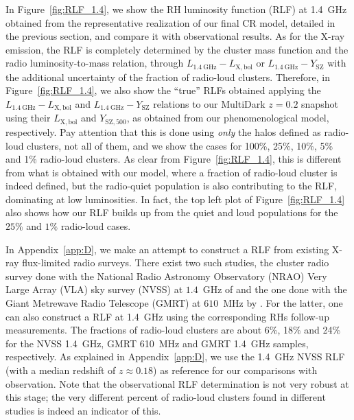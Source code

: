 \documentclass[traditabstract]{aa}
\newcommand{\rmn}{\mathrm}
\begin{document}
In Figure~\ref{fig:RLF_1.4}, we show the RH luminosity function (RLF) at 1.4~GHz obtained from the representative realization of our final CR model, detailed in the previous section, and compare it with observational results. As for the X-ray emission, the RLF is completely determined by the cluster mass function and the radio luminosity-to-mass relation, through $L_{1.4~\rmn{GHz}}-L_{ \rmn{X,bol}}$ or $L_{1.4~\rmn{GHz}}-Y_{\rmn{SZ}}$ with the additional uncertainty of the fraction of radio-loud clusters. Therefore, in Figure~\ref{fig:RLF_1.4}, we also show the ``true'' RLFs obtained applying  the $L_{1.4~\rmn{GHz}}-L_{\rmn{X,bol}}$ and $L_{1.4~\rmn{GHz}}-Y_{\rmn{SZ}}$ relations to our MultiDark $z = 0.2$ snapshot using their $L_{\rmn{X,bol}}$ and $Y_{\rmn{SZ}, 500}$, as obtained from our phenomenological model, respectively. Pay attention that this is done using \emph{only} the halos defined as radio-loud clusters, not all of them, and we show the cases for 100\%, 25\%, 10\%, 5\% and 1\% radio-loud clusters. As clear from Figure~\ref{fig:RLF_1.4}, this is different from what is obtained with our model, where a fraction of radio-loud cluster is indeed defined, but the radio-quiet population is also contributing to the RLF, dominating at low luminosities. In fact, the top left plot of Figure~\ref{fig:RLF_1.4} also shows how our RLF builds up from the quiet and loud populations for the $25\%$ and $1\%$ radio-loud cases.

In Appendix~\ref{app:D}, we make an attempt to construct a RLF from existing X-ray flux-limited radio surveys. There exist two such studies, the cluster radio survey done with the National Radio Astronomy Observatory (NRAO) Very Large Array (VLA) sky survey (NVSS) at $1.4$~GHz of \cite{1999NewA....4..141G} and the one done with the Giant Metrewave Radio Telescope (GMRT) at $610$~MHz by \cite{VenturiGMRT_1,VenturiGMRT_2}. For the latter, one can also construct a RLF at 1.4~GHz using the corresponding RHs follow-up measurements. The fractions of radio-loud clusters are about 6\%, 18\% and 24\% for the NVSS 1.4~GHz, GMRT 610~MHz and GMRT 1.4~GHz samples, respectively. As explained in Appendix~\ref{app:D}, we use the 1.4~GHz NVSS RLF (with a median redshift of $z \approx 0.18$) as reference for our comparisons with observation. Note that the observational RLF determination is not very robust at this stage; the very different percent of radio-loud clusters found in different studies is indeed 
an indicator of this.
 
\end{document}
